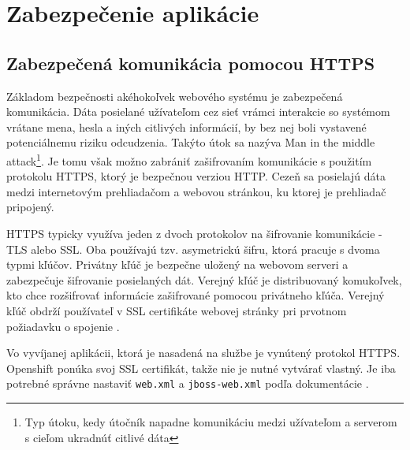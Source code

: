\documentclass[12pt,oneside]{fithesis2}
\begin{document}
      \section{Zabezpečenie aplikácie}
      		\subsection{Zabezpečená komunikácia pomocou HTTPS} \label{https}
      		\par Základom bezpečnosti akéhokoľvek webového systému je zabezpečená komunikácia. Dáta posielané užívateľom cez sieť vrámci interakcie so systémom vrátane mena, hesla a iných citlivých informácií, by bez nej boli vystavené potenciálnemu riziku odcudzenia. Takýto útok sa nazýva Man in the middle attack\footnote{Typ útoku, kedy útočník napadne komunikáciu medzi užívateľom a serverom s cieľom ukradnúť citlivé dáta}. Je tomu však možno zabrániť zašifrovaním komunikácie s použitím protokolu HTTPS, ktorý je bezpečnou verziou HTTP. Cezeň sa posielajú dáta medzi internetovým prehliadačom a webovou stránkou, ku ktorej je prehliadač pripojený. 
      		\par HTTPS typicky využíva jeden z dvoch protokolov na šifrovanie komunikácie - TLS alebo SSL. Oba používajú tzv. asymetrickú šifru, ktorá pracuje s dvoma typmi kľúčov. Privátny kľúč je bezpečne uložený na webovom serveri a zabezpečuje šifrovanie posielaných dát. Verejný kľúč je distribuovaný komukoľvek, kto chce rozšifrovať informácie zašifrované pomocou privátneho kľúča. Verejný kľúč obdrží používateľ v SSL certifikáte webovej stránky pri prvotnom požiadavku o spojenie \cite{comodo15}.
      		\par Vo vyvíjanej aplikácii, ktorá je nasadená na službe je vynútený protokol HTTPS. Openshift ponúka svoj SSL certifikát, takže nie je nutné vytvárať vlastný. Je iba potrebné správne nastaviť \texttt{web.xml} a \texttt{jboss-web.xml} podľa dokumentácie \cite{openshift15}.
      		\pagebreak
\end{document}
